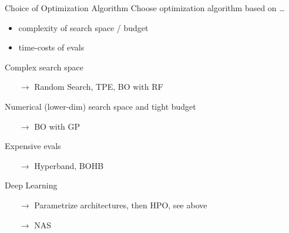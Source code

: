 \begin{frame}{Choice of Optimization Algorithm}
  Choose optimization algorithm based on \ldots
  \begin{itemize}
    \item complexity of search space / budget
    \item time-costs of evals
  \end{itemize}

  \vspace{0.5em}

  Complex search space
  \begin{itemize}
    \item[$\rightarrow$] Random Search, TPE, BO with RF 
  \end{itemize}
  Numerical (lower-dim) search space and tight budget
  \begin{itemize}
    \item[$\rightarrow$] BO with GP
  \end{itemize}
  Expensive evals
  \begin{itemize}
    \item[$\rightarrow$] Hyperband, BOHB
  \end{itemize}
  Deep Learning 
  \begin{itemize}
    \item[$\rightarrow$]Parametrize architectures, then HPO, see above
    \item[$\rightarrow$]NAS 
  \end{itemize}

\end{frame}




